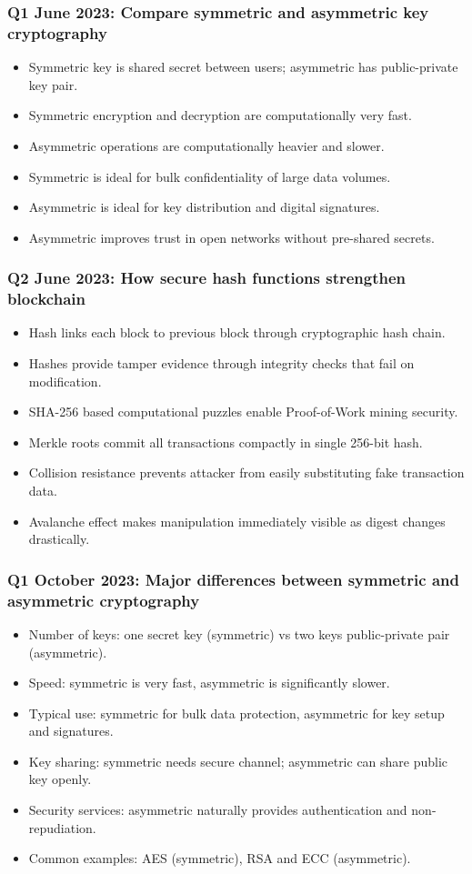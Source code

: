 \documentclass[12pt,a4paper]{article}
\begin{document}
\subsubsection*{Q1 June 2023: Compare symmetric and asymmetric key cryptography}
\begin{itemize}
\item Symmetric key is shared secret between users; asymmetric has public-private key pair.
\item Symmetric encryption and decryption are computationally very fast.
\item Asymmetric operations are computationally heavier and slower.
\item Symmetric is ideal for bulk confidentiality of large data volumes.
\item Asymmetric is ideal for key distribution and digital signatures.
\item Asymmetric improves trust in open networks without pre-shared secrets.
\end{itemize}

\subsubsection*{Q2 June 2023: How secure hash functions strengthen blockchain}
\begin{itemize}
\item Hash links each block to previous block through cryptographic hash chain.
\item Hashes provide tamper evidence through integrity checks that fail on modification.
\item SHA-256 based computational puzzles enable Proof-of-Work mining security.
\item Merkle roots commit all transactions compactly in single 256-bit hash.
\item Collision resistance prevents attacker from easily substituting fake transaction data.
\item Avalanche effect makes manipulation immediately visible as digest changes drastically.
\end{itemize}

\subsubsection*{Q1 October 2023: Major differences between symmetric and asymmetric cryptography}
\begin{itemize}
\item Number of keys: one secret key (symmetric) vs two keys public-private pair (asymmetric).
\item Speed: symmetric is very fast, asymmetric is significantly slower.
\item Typical use: symmetric for bulk data protection, asymmetric for key setup and signatures.
\item Key sharing: symmetric needs secure channel; asymmetric can share public key openly.
\item Security services: asymmetric naturally provides authentication and non-repudiation.
\item Common examples: AES (symmetric), RSA and ECC (asymmetric).
\end{itemize}
\end{document}
